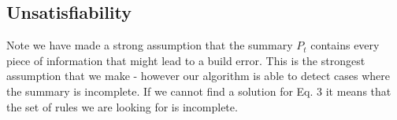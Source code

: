 \subsection{Unsatisfiability}
Note we have made a strong assumption that the summary $P_t$ contains every piece of information that might lead to a build error. 
This is the strongest assumption that we make - however our algorithm is able to detect cases where the summary is incomplete.
If we cannot find a solution for Eq. 3 it means that the set of rules we are looking for is incomplete.
